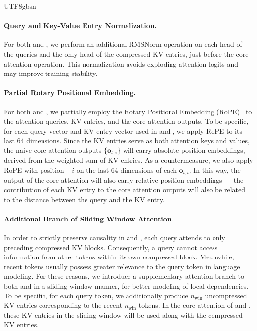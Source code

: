 \begin{CJK*}{UTF8}{gbsn}
\paragraph{Query and Key-Value Entry Normalization.}
For both \csa{} and \hca{}, we perform an additional RMSNorm operation on each head of the queries and the only head of the compressed KV entries, just before the core attention operation. 
This normalization avoids exploding attention logits and may improve training stability. 

\paragraph{Partial Rotary Positional Embedding.}
For both \csa{} and \hca{}, we partially employ the Rotary Positional Embedding (RoPE)~\citep{su2024roformer} to the attention queries, KV entries, and the core attention outputs. 
To be specific, for each query vector and KV entry vector used in \csa{} and \hca{}, we apply RoPE to its last 64 dimensions. 
Since the KV entries serve as both attention keys and values, the naive core attention outputs $\{\mathbf{o}_{t,i}\}$ will carry absolute position embeddings, derived from the weighted sum of KV entries. 
As a countermeasure, we also apply RoPE with position $-i$ on the last 64 dimensions of each $\mathbf{o}_{t,i}$. 
In this way, the output of the core attention will also carry relative position embeddings --- the contribution of each KV entry to the core attention outputs will also be related to the distance between the query and the KV entry.

\paragraph{Additional Branch of Sliding Window Attention.}
In order to strictly preserve causality in \csa{} and \hca{}, each query attends to only preceding compressed KV blocks. 
Consequently, a query cannot access information from other tokens within its own compressed block.
Meanwhile, recent tokens usually possess greater relevance to the query token in language modeling.
For these reasons, we introduce a supplementary attention branch to both \csa{} and \hca{} in a sliding window manner, for better modeling of local dependencies.
To be specific, for each query token, we additionally produce $n_{\text{win}}$ uncompressed KV entries corresponding to the recent $n_{\text{win}}$ tokens. 
In the core attention of \csa{} and \hca{}, these KV entries in the sliding window will be used along with the compressed KV entries. 


\end{CJK*}
